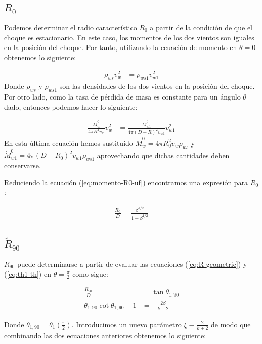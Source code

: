 \subsection{$R_0$}
Podemos determinar el radio característico $R_0$ a partir de la condición de que el choque es estacionario. En este caso,
los momentos de los dos vientos son iguales en la posición del choque. Por tanto, utilizando la ecuación de momento en $\theta=0$
obtenemos lo siguiente:

\begin{align}
  \rho_{ws} v^2_w &= \rho_{ws1} v^2_{w1}
\end{align}
Donde $\rho_{ws}$ y $\rho_{ws1}$ son las densidades de los dos vientos en la posición del choque. Por otro lado, como la tasa de pérdida
de masa es constante para un ángulo $\theta$ dado, entonces podemos hacer lo siguiente:

\begin{align}
  \frac{\dot{M}^0_w}{4\pi R^2 v_w}v^2_w &= \frac{\dot{M}^0_{w1}}{4\pi\left(D-R\right)^2v_{w1}}v^2_{w1} \label{eq:momento-R0-uf}
\end{align}
En esta última ecuación hemos sustituído $\dot{M}^0_w = 4\pi R_0^2 v_w \rho_{ws}$ y \\
$\dot{M}^0_{w1} = 4\pi \left(D - R_0\right)^2 v_{w1} \rho_{ws1}$ aprovechando que dichas cantidades deben conservarse.

Reduciendo la ecuación (\ref{eq:momento-R0-uf}) encontramos una expresión para $R_0$:

\begin{align}
  \frac{R_0}{D} = \frac{\beta^{1/2}}{1+\beta^{1/2}}
\end{align}

\subsection{$\tilde{R}_{90}$}
$R_{90}$ puede determinarse a partir de evaluar las ecuaciones (\ref{eq:R-geometric}) y (\ref{eq:th1-th}) en $\theta=\frac{\pi}{2}$
como sigue:

\begin{align}
  \frac{R_{90}}{D} &= \tan\theta_{1,90} \\
  \theta_{1,90}\cot\theta_{1,90} -1 &=  - \frac{2\beta}{k+2}
\end{align}

Donde $\theta_{1,90} = \theta_1\left(\frac{\pi}{2}\right)$. Introducimos un nuevo parámetro $\xi \equiv \frac{2}{k+2}$ de modo que
combinando las dos ecuaciones anteriores obtenemos lo siguiente:

